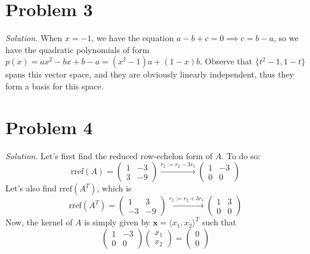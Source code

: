 \documentclass{article}
\begin{document}
\section*{Problem 3}
\emph{Solution. }When $x = -1$, we have the equation $a - b + c = 0 \implies c = b-a$, so we have the quadratic polynomials of form $p(x) = ax^{2} - bx + b-a = (x^2 - 1)a + (1-x)b$. Observe that $\{t^{2} - 1, 1 - t\}$ spans this vector space, and they are obviously linearly independent, thus they form a basis for this space.\newpage
\section*{Problem 4}
\emph{Solution. }Let's first find the reduced row-echelon form of $A$. To do so:
\begin{equation*}
    \text{rref}(A) = \begin{pmatrix}
        1& -3\\
        3 & -9
    \end{pmatrix} \xrightarrow{r_{2} := r_{2} - 3r_{1}}
    \begin{pmatrix}
        1 & -3\\
        0 & 0
    \end{pmatrix}
\end{equation*}
Let's also find $\text{rref}(A^{T})$, which is
\begin{equation*}
    \text{rref}(A^T) = \begin{pmatrix}
        1 & 3\\
        -3 & -9
    \end{pmatrix} \xrightarrow{r_{2} := r_{2} + 3r_{1}} \begin{pmatrix}
        1 & 3\\
        0 & 0
    \end{pmatrix}
\end{equation*}
Now, the kernel of $A$ is simply given by $\mathbf{x} = \langle x_1,x_2\rangle^T$ such that
\begin{equation*}
    \begin{pmatrix}
        1 & -3\\
        0 & 0
    \end{pmatrix}\begin{pmatrix}
        x_1 \\
        x_2
    \end{pmatrix}= \begin{pmatrix}
        0\\
        0
    \end{pmatrix}
\end{equation*}
\end{document}
